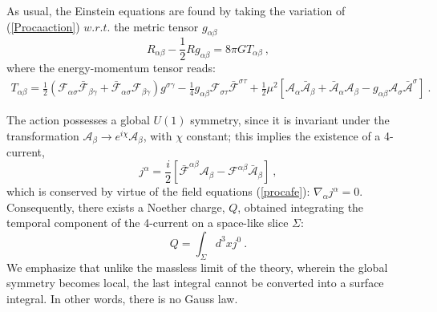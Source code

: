As usual, the Einstein equations are found by taking the variation of
(\ref{Procaaction}) $w.r.t.$ the metric tensor $g_{\alpha \beta}$
\begin{equation}
R_{\alpha \beta}-\frac{1}{2}R g_{\alpha \beta}=8 \pi G T_{\alpha \beta} \ ,
\label{Einstein-eqs}
\end{equation}
where the energy-momentum tensor reads:
\begin{eqnarray}
T_{\alpha\beta}=\frac{1}{2}
( \mathcal{F}_{\alpha \sigma }\bar{\mathcal{F}}_{\beta \gamma}
+\bar{\mathcal{F}}_{\alpha \sigma } \mathcal{F}_{\beta \gamma}
)g^{\sigma \gamma}
-\frac{1}{4}g_{\alpha\beta}\mathcal{F}_{\sigma\tau}\bar{\mathcal{F}}^{\sigma\tau}+\frac{1}{2}\mu^2\left[  
\mathcal{A}_{\alpha}\bar{\mathcal{A}}_{\beta}
+\bar{\mathcal{A}}_{\alpha}\mathcal{A}_{\beta}
-g_{\alpha\beta} \mathcal{A}_\sigma\bar{\mathcal{A}}^\sigma\right]\ . \ \ \ \ \ \ \  \ 
\label{procaemt}
\end{eqnarray}

The action possesses a global $U(1)$ symmetry, since it is invariant under the transformation 
$\mathcal{A}_\beta\rightarrow e^{i\chi}\mathcal{A}_\beta$, with $\chi$ constant; 
this implies the existence of a  4-current, 
%
\begin{equation}
\label{j}
j^\alpha=\frac{i}{2}\left[\bar{\mathcal{F}}^{\alpha \beta}\mathcal{A}_\beta-\mathcal{F}^{\alpha\beta}\bar{\mathcal{A}}_\beta\right] \ ,
\end{equation}
which is conserved by virtue of the field equations (\ref{procafe}): $\nabla_\alpha j^\alpha=0$. Consequently, there exists a Noether charge, $Q$, obtained integrating the temporal component of the 4-current on a space-like slice $\Sigma$:
\begin{equation}
Q=\int_\Sigma d^3x j^0 \ .
\label{Pq}
\end{equation}
We emphasize that unlike the massless limit of the theory, wherein the global symmetry becomes local, the last integral cannot be converted into a surface integral. In other words, there is no Gauss law.


 
